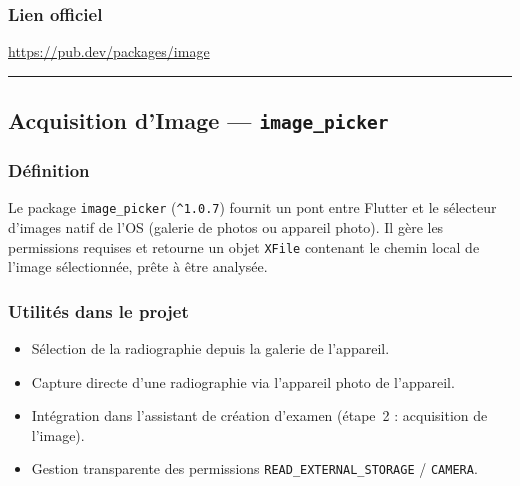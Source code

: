\documentclass[12pt,a4paper]{report}
\begin{document}
\subsubsection*{Lien officiel}
\url{https://pub.dev/packages/image}

\medskip\hrule\medskip

\subsection{Acquisition d'Image --- \texttt{image\_picker}}

\noindent\begin{minipage}[t]{0.66\textwidth}
\subsubsection*{Définition}
Le package \texttt{image\_picker} (\texttt{\^{}1.0.7}) fournit un pont entre Flutter et le sélecteur d'images natif de l'OS (galerie de photos ou appareil photo). Il gère les permissions requises et retourne un objet \texttt{XFile} contenant le chemin local de l'image sélectionnée, prête à être analysée.
\end{minipage}\hfill
\begin{minipage}[t]{0.30\textwidth}
\vspace{0pt}
\begin{center}
\end{center}
\end{minipage}

\subsubsection*{Utilités dans le projet}
\begin{itemize}
  \item Sélection de la radiographie depuis la galerie de l'appareil.
  \item Capture directe d'une radiographie via l'appareil photo de l'appareil.
  \item Intégration dans l'assistant de création d'examen (étape~2 : acquisition de l'image).
  \item Gestion transparente des permissions \texttt{READ\_EXTERNAL\_STORAGE} / \texttt{CAMERA}.
\end{itemize}
\end{document}
